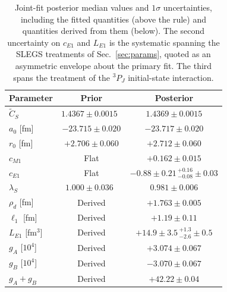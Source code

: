 \documentclass[
  aps,prd,twocolumn,nofootinbib,superscriptaddress,
  longbibliography,floatfix,preprintnumbers
]{revtex4-2}
\newcommand{\Mone}{M1}
\newcommand{\Eone}{E1}
\newcommand{\CSv}{\tilde{C}_{S}}
\begin{document}
\begin{table}[t]
  \centering
  \begin{tabular}{lcc}
    \hline\hline
    Parameter & Prior & Posterior \\
    \hline
    $\CSv$ & $1.4367\pm0.0015$~\cite{deSwart:1995ui} & $1.4369\pm0.0015$ \\
    $a_{0}$ [fm] & $-23.715\pm0.020$ & $-23.717\pm0.020$ \\
    $r_{0}$ [fm] & $+2.706\pm0.060$ & $+2.712\pm0.060$ \\
    $c_{\Mone}$ & Flat & $+0.162\pm0.015$ \\
    $c_{\Eone}$ & Flat & $-0.88\pm0.21\,{}^{+0.16}_{-0.08}\pm0.03$ \\
    $\lambda_{S}$ & $1.000\pm0.036$~\cite{Chen:2025oyj} & $0.981\pm0.006$ \\
    \hline
    $\rho_{d}$ [fm] & Derived & $+1.763\pm0.005$ \\
    $\ell_{1}$ [fm] & Derived & $+1.19\pm0.11$ \\
    $L_{\Eone}$ [fm$^{3}$] & Derived & $+14.9\pm3.5\,{}^{+1.3}_{-2.6}\pm0.5$ \\
    $g_{A}$ [$10^{4}$] & Derived & $+3.074\pm0.067$ \\
    $g_{B}$ [$10^{4}$] & Derived & $-3.070\pm0.067$ \\
    $g_{A}+g_{B}$ & Derived & $+42.22\pm0.04$ \\

    \hline\hline
  \end{tabular}
  \caption{Joint-fit posterior median values and $1\sigma$ uncertainties, including the fitted quantities (above the rule) and quantities derived from them (below). The second uncertainty on $c_{\Eone}$ and $L_{\Eone}$ is the systematic spanning the SLEGS treatments of Sec.~\ref{sec:params}, quoted as an asymmetric envelope about the primary fit. 
  The third spans the treatment of the ${}^{3}P_{J}$ initial-state interaction.}
  \label{tab:posterior}
\end{table}
\end{document}
